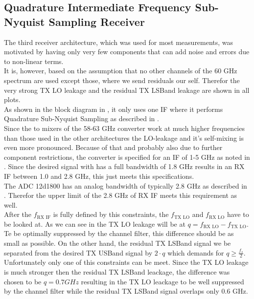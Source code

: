 \subsection{Quadrature Intermediate Frequency Sub-Nyquist Sampling Receiver}
\label{sec:rx_2}
The third receiver architecture, which was used for most measurements,
was motivated by having only very few components that can add noise
and errors due to non-linear terms. \\

It is, however, based on the assumption that no other channels of the
60 GHz spectrum are used except those, where we send residuals our self.
Therefor the very strong \gls{TX} \gls{LO} leakage and
the residual \gls{TX} \gls{LSBand} leakage are shown in all plots. \\

As shown in the block diagram in , it only uses one
\gls{IF} where it performs Quadrature Sub-Nyquist Sampling as described
in . \\

Since the to mixers of the 58-63 GHz converter work at much
higher frequencies than those used in the other architectures the
\gls{LO}-leakage and it's self-mixing is even more pronounced.
Because of that and probably also due to further component restrictions,
the converter is specified for an \gls{IF} of 1-5 GHz as noted in
.
Since the desired signal with has a full bandwidth of 1.8 GHz results
in an \gls{RX} \gls{IF} between 1.0 and 2.8 GHz, this just meets
this specifications. \\

The \gls{ADC} 12d1800 has an analog bandwidth of typically 2.8 GHz
as described in .
Therefor the upper limit of the 2.8 GHz of \gls{RX} \gls{IF} meets this
requirement as well. \\

After the $f_{\text{RX IF}}$ is fully defined by this constraints, the
$f_{\text{TX LO}}$ and $f_{\text{RX LO}}$ have to be looked at.
As we can see in  the \gls{TX} \gls{LO}
leakage will be at $q = f_{\text{RX LO}} - f_{\text{TX LO}}$. Te be optimally
suppressed by the channel filter, this difference should be as small
as possible. On the other hand, the residual \gls{TX} \gls{LSBand} signal
we be separated from the desired \gls{TX} \gls{USBand} signal by $2 \cdot q$
which demands for $q \geq \frac{f_s}{2}$. \\
Unfortunately only one of this constraints can be meet. Since the \gls{TX}
\gls{LO} leakage is much stronger then the residual \gls{TX} \gls{LSBand}
leackage, the difference was chosen to be $q = 0.7 GHz$ resulting in the
\gls{TX} \gls{LO} leackage to be well suppressed by the channel filter while
the residual \gls{TX} \gls{LSBand} signal overlaps only 0.6 GHz. \\

